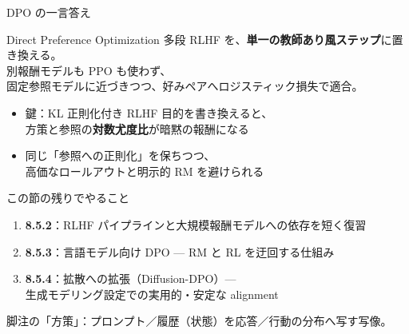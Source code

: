 \asmain
\begin{frame}{DPO の一言答え}
    \begin{block}{Direct Preference Optimization}
        多段 RLHF を、\textbf{単一の教師あり風ステップ}に置き換える。\\
        別報酬モデルも PPO も使わず、\\
        固定参照モデルに近づきつつ、好みペアへロジスティック損失で適合。
    \end{block}
    \begin{itemize}
        \item 鍵：KL 正則化付き RLHF 目的を書き換えると、\\
        方策と参照の\textbf{対数尤度比}が暗黙の報酬になる
        \item 同じ「参照への正則化」を保ちつつ、\\
        高価なロールアウトと明示的 RM を避けられる
    \end{itemize}
\end{frame}
\asmain
\begin{frame}{この節の残りでやること}
    \begin{enumerate}
        \item \textbf{8.5.2}：RLHF パイプラインと大規模報酬モデルへの依存を短く復習
        \item \textbf{8.5.3}：言語モデル向け DPO --- RM と RL を迂回する仕組み
        \item \textbf{8.5.4}：拡散への拡張（Diffusion-DPO）---\\
        生成モデリング設定での実用的・安定な alignment
    \end{enumerate}
    \vfill
    \footnotesize
    脚注の「方策」：プロンプト／履歴（状態）を応答／行動の分布へ写す写像。
\end{frame}

